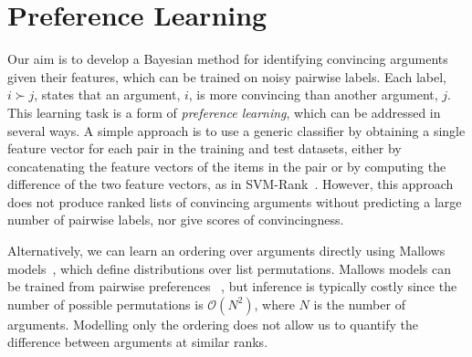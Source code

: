 \section{Preference Learning}\label{sec:pref_learning}

Our aim is to develop a Bayesian method for identifying convincing arguments 
given their features, which can be trained on noisy pairwise labels.
Each label, $i \succ j$, states that an argument, $i$, is more convincing than another argument, $j$. 
This learning task is a form of \emph{preference learning}, which can be addressed in several ways.
A simple approach is to use a generic classifier by
obtaining a single feature vector for each pair in the training and test datasets,
either by concatenating the feature vectors of the items in the pair 
or by computing the difference of the two feature vectors, as in SVM-Rank~\cite{joachims2002optimizing}. 
However, this approach does not produce ranked lists of convincing arguments without predicting a large number of pairwise labels, nor give scores of convincingness. %

Alternatively, we can learn an ordering over arguments directly using Mallows models~\cite{mallows1957non},
which define distributions over list permutations.  
Mallows models can be trained from pairwise preferences 
~\cite{lu2011learning}, but inference is typically costly
since the number of possible permutations is $\mathcal{O}(N^2)$, 
where $N$ is the number of arguments. 
Modelling only the ordering does not allow us to quantify 
the difference between arguments at similar ranks.

